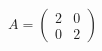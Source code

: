 \documentclass[preview]{standalone}
\begin{document}
\begin{align*}
A = \begin{pmatrix} 2 & 0 \\ 0 & 2 \end{pmatrix}
\end{align*}
\end{document}
